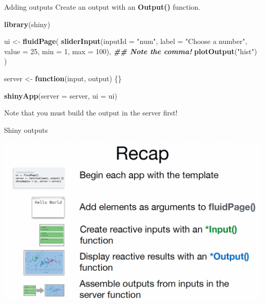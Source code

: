 \documentclass[
  ignorenonframetext,
]{beamer}
\newenvironment{Shaded}{\begin{snugshade}}{\end{snugshade}}
\newcommand{\AttributeTok}[1]{\textcolor[rgb]{0.13,0.29,0.53}{#1}}
\newcommand{\ControlFlowTok}[1]{\textcolor[rgb]{0.13,0.29,0.53}{\textbf{#1}}}
\newcommand{\DecValTok}[1]{\textcolor[rgb]{0.00,0.00,0.81}{#1}}
\newcommand{\DocumentationTok}[1]{\textcolor[rgb]{0.56,0.35,0.01}{\textbf{\textit{#1}}}}
\newcommand{\FunctionTok}[1]{\textcolor[rgb]{0.13,0.29,0.53}{\textbf{#1}}}
\newcommand{\NormalTok}[1]{#1}
\newcommand{\OtherTok}[1]{\textcolor[rgb]{0.56,0.35,0.01}{#1}}
\newcommand{\StringTok}[1]{\textcolor[rgb]{0.31,0.60,0.02}{#1}}
\begin{document}
\begin{frame}[fragile]{Adding outputs}
\label{adding-outputs}
Create an output with an \textbf{Output()} function.

\begin{Shaded}
\begin{Highlighting}[]
\FunctionTok{library}\NormalTok{(shiny)}

\NormalTok{ui }\OtherTok{\textless{}{-}} \FunctionTok{fluidPage}\NormalTok{(}
  \FunctionTok{sliderInput}\NormalTok{(}\AttributeTok{inputId =} \StringTok{"num"}\NormalTok{,}
    \AttributeTok{label =} \StringTok{"Choose a number"}\NormalTok{,}
    \AttributeTok{value =} \DecValTok{25}\NormalTok{, }\AttributeTok{min =} \DecValTok{1}\NormalTok{, }\AttributeTok{max =} \DecValTok{100}\NormalTok{), }\DocumentationTok{\#\# Note the comma!}
  \FunctionTok{plotOutput}\NormalTok{(}\StringTok{"hist"}\NormalTok{)}
\NormalTok{  )}

\NormalTok{server }\OtherTok{\textless{}{-}} \ControlFlowTok{function}\NormalTok{(input, output) \{\}}

\FunctionTok{shinyApp}\NormalTok{(}\AttributeTok{server =}\NormalTok{ server, }\AttributeTok{ui =}\NormalTok{ ui)}
\end{Highlighting}
\end{Shaded}

Note that you must build the output in the server first!
\end{frame}

\begin{frame}{Shiny outputs}
\label{shiny-outputs-2}
\center

\includegraphics{shinyfigs/shiny_recap1.png}
\end{frame}
\end{document}
